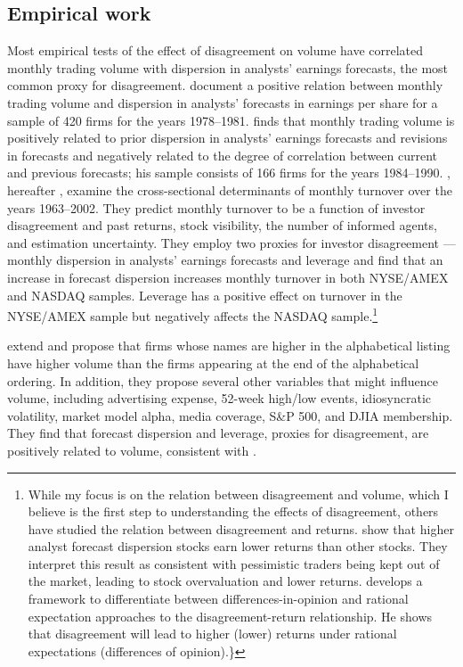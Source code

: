 \documentclass[
  12pt,
  a4paper,
  twoside,
  onecolumn]{article}
\begin{document}
\hypertarget{empirical-work}{%
\subsection{Empirical work}\label{empirical-work}}

Most empirical tests of the effect of disagreement on volume have
correlated monthly trading volume with dispersion in analysts' earnings
forecasts, the most common proxy for disagreement.
\cite{ajinkya_etal_1991} document a positive relation between monthly
trading volume and dispersion in analysts' forecasts in earnings per
share for a sample of 420 firms for the years 1978--1981.
\cite{barron_1995} finds that monthly trading volume is positively
related to prior dispersion in analysts' earnings forecasts and
revisions in forecasts and negatively related to the degree of
correlation between current and previous forecasts; his sample consists
of 166 firms for the years 1984--1990. \cite{chordia_etal2006},
hereafter , examine the cross-sectional
determinants of monthly turnover over the years 1963--2002. They predict
monthly turnover to be a function of investor disagreement and past
returns, stock visibility, the number of informed agents, and estimation
uncertainty. They employ two proxies for investor disagreement ---
monthly dispersion in analysts' earnings forecasts and leverage and find
that an increase in forecast dispersion increases monthly turnover in
both NYSE/AMEX and NASDAQ samples. Leverage has a positive effect on
turnover in the NYSE/AMEX sample but negatively affects the NASDAQ
sample.\footnote{While my focus is on the relation between disagreement
  and volume, which I believe is the first step to understanding the
  effects of disagreement, others have studied the relation between
  disagreement and returns. \cite{diether_etal2002} show that higher
  analyst forecast dispersion stocks earn lower returns than other
  stocks. They interpret this result as consistent with pessimistic
  traders being kept out of the market, leading to stock overvaluation
  and lower returns. \cite{banerjee2011} develops a framework to
  differentiate between differences-in-opinion and rational expectation
  approaches to the disagreement-return relationship. He shows that
  disagreement will lead to higher (lower) returns under rational
  expectations (differences of opinion).\}}

\cite{jacobs_hillert2015} extend  and
propose that firms whose names are higher in the alphabetical listing
have higher volume than the firms appearing at the end of the
alphabetical ordering. In addition, they propose several other variables
that might influence volume, including advertising expense, 52-week
high/low events, idiosyncratic volatility, market model alpha, media
coverage, S\&P 500, and DJIA membership. They find that forecast
dispersion and leverage, proxies for disagreement, are positively
related to volume, consistent with .
\end{document}
